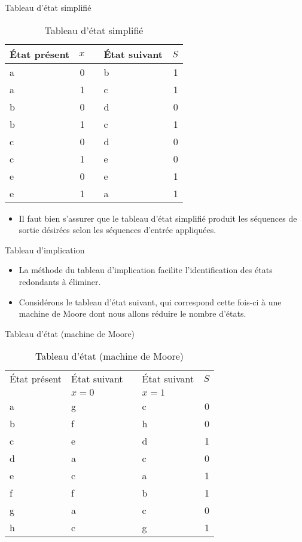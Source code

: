 \documentclass[presentation]{beamer}
\begin{document}
\begin{frame}[label={sec:org0772b81}]{Tableau d'état simplifié}
\begin{table}[htbp]
\caption{\label{tab:orgb6748af}Tableau d'état simplifié}
\centering
\begin{tabular}{lrllr}
État présent & \(x\) &  & État suivant & \(S\)\\[0pt]
\hline
a & 0 &  & b & 1\\[0pt]
a & 1 &  & c & 1\\[0pt]
b & 0 &  & d & 0\\[0pt]
b & 1 &  & c & 1\\[0pt]
c & 0 &  & d & 0\\[0pt]
c & 1 &  & e & 0\\[0pt]
e & 0 &  & e & 1\\[0pt]
e & 1 &  & a & 1\\[0pt]
\end{tabular}
\end{table}

\begin{itemize}
\item Il faut bien s'assurer que le tableau d'état simplifié produit les séquences de sortie désirées selon les séquences d'entrée appliquées.
\end{itemize}
\end{frame}

\begin{frame}[label={sec:orgda31164}]{Tableau d'implication}
\begin{itemize}
\item La méthode du tableau d'implication facilite l'identification des états redondants à éliminer.

\item Considérons le tableau d'état suivant, qui correspond cette fois-ci à une machine de Moore dont nous allons réduire le nombre d'états.
\end{itemize}
\end{frame}

\begin{frame}[label={sec:orge121502}]{Tableau d'état (machine de Moore)}
\begin{table}[htbp]
\caption{\label{tab:org546cc2a}Tableau d'état (machine de Moore)}
\centering
\begin{tabular}{llllr}
État présent & État suivant &  & État suivant & \(S\)\\[0pt]
 & \(x=0\) &  & \(x=1\) & \\[0pt]
\hline
a & g &  & c & 0\\[0pt]
b & f &  & h & 0\\[0pt]
c & e &  & d & 1\\[0pt]
d & a &  & c & 0\\[0pt]
e & c &  & a & 1\\[0pt]
f & f &  & b & 1\\[0pt]
g & a &  & c & 0\\[0pt]
h & c &  & g & 1\\[0pt]
\end{tabular}
\end{table}
\end{frame}
\end{document}
